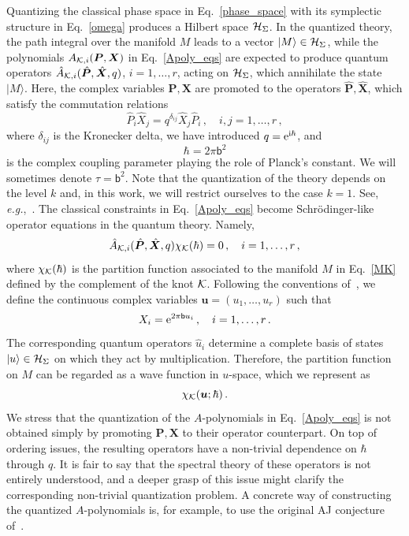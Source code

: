 \documentclass[a4paper,11pt]{article}
\theoremstyle{definition}
\newcommand{\CH}{{\cal H}}
\newcommand{\CK}{{\cal K}}
\newcommand{\re}{{\rm e}}
\newcommand{\ri}{{\rm i}}
\newcommand{\mb}{{\mathsf{b}}}
\newcommand{\be}{\begin{equation}}
\newcommand{\ee}{\end{equation}}
\begin{document}
Quantizing the classical phase space in Eq.~\eqref{phase_space} with its symplectic structure in Eq.~\eqref{omega} produces a Hilbert space $\CH_{\Sigma}$. In the quantized theory, the path integral over the manifold $M$ leads to a vector $|M\rangle \in \CH_{\Sigma}$, while the polynomials $A_{\CK, i}(\bm{P}, \bm{X})$ in Eq.~\eqref{Apoly_eqs} are expected to produce quantum operators $\hat{A}_{\CK, i}(\hat{\bm{P}}, \hat{\bm{X}},q)$, $i=1, \dots, r$, acting on $\CH_{\Sigma}$, which annihilate the state $|M\rangle$. Here, the complex variables $\bm{P}, \bm{X}$ are promoted to the operators $\hat{\bm{P}}, \hat{\bm{X}}$, which satisfy the commutation relations
\be
\hat{P}_i \hat{X}_j = q^{\delta_{ij}} \hat{X}_j \hat{P}_i \, , \quad i,j=1, \dots, r \, ,
\ee
where $\delta_{ij}$ is the Kronecker delta, we have introduced $q= \re^{\ri \hbar}$, and 
\be
\hbar = 2 \pi \mb^2
\ee 
is the complex coupling parameter playing the role of Planck's constant. We will sometimes denote $\tau= \mb^2$. Note that the quantization of the theory depends on the level $k$ and, in this work, we will restrict ourselves to the case $k=1$. 
See, {\it e.g.},~\cite{dimofte-levelk}. The classical constraints in Eq.~\eqref{Apoly_eqs} become Schr\"odinger-like operator equations in the quantum theory. Namely,
%
\be \label{quantumApoly}
\hat{A}_{\CK, i}(\hat{\bm{P}}, \hat{\bm{X}},q) \chi_{\CK}(\hbar) = 0 \, , \quad i=1, \dots, r \, ,
\ee
where $\chi_\CK(\hbar)$ is the partition function associated to the manifold $M$ in Eq.~\eqref{MK} defined by the complement of the knot $\CK$. Following the conventions of~\cite{ggm2}, we define the continuous complex variables $\bm{u}=(u_1, \dots, u_r)$ such that
\be
X_i = \re^{2 \pi \mb u_i} \, , \quad i=1, \dots, r \, .
\ee
The corresponding quantum operators $\hat{u}_i$ determine a complete basis of states $|u\rangle \in \CH_{\Sigma}$ on which they act by multiplication. 
Therefore, the partition function on $M$ can be regarded as a wave function in $u$-space, which we represent as
\be
\chi_{\CK}(\bm{u}; \hbar) \, .
\ee
%
We stress that the quantization of the $A$-polynomials in Eq.~\eqref{Apoly_eqs} is not obtained simply by promoting $\bm{P}, \bm{X}$ to their operator counterpart. 
On top of ordering issues, the resulting operators have a non-trivial dependence on $\hbar$ through $q$. 
It is fair to say that the spectral theory of these operators is not entirely understood, and a deeper grasp of this issue might clarify the corresponding non-trivial quantization problem. 
A concrete way of constructing the quantized $A$-polynomials is, for example, to use the original AJ conjecture of~\cite{stavros-aj}. 
\end{document}
